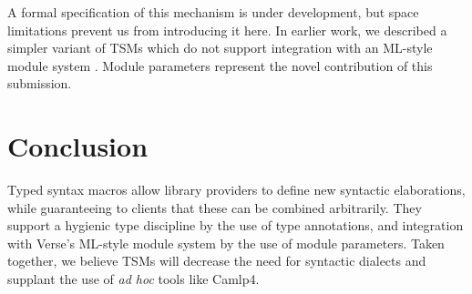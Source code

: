 \documentclass[preprint]{sigplanconf}
\begin{document}
A formal specification of this mechanism is under development, but space limitations prevent us from introducing it here. In earlier work, we described a simpler variant of TSMs which do not support integration with an ML-style module system \cite{sac15}. Module parameters represent the novel contribution of this submission.
\section{Conclusion}
Typed syntax macros allow library providers to define new syntactic elaborations, while guaranteeing to clients that these can be combined arbitrarily. They support a hygienic type discipline by the use of type annotations, and integration with Verse's ML-style module system by the use of module parameters. Taken together, we believe TSMs will decrease the need for syntactic dialects and supplant the use of \emph{ad hoc} tools like Camlp4.







\end{document}
